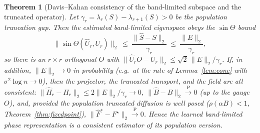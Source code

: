\documentclass[aps,prresearch,reprint,amsmath,amssymb,nofootinbib,superscriptaddress,floatfix]{revtex4-2}
\newtheorem{theorem}{Theorem}
\theoremstyle{definition}
\theoremstyle{remark}
\theoremstyle{plain}
\begin{document}
\begin{theorem}[Davis--Kahan consistency of the band-limited subspace and the truncated operator]
\label{thm:estconsistency}
Let $\gamma_r=\lambda_r(S)-\lambda_{r+1}(S)>0$ be the population truncation gap. Then the estimated
band-limited eigenspace obeys the $\sin\Theta$ bound
\begin{equation}
\|\sin\Theta(\widehat U_r,U_r)\|_2\ \le\ \frac{\|\widehat S-S\|_2}{\gamma_r}
\ \le\ \frac{\|E\|_2}{\gamma_r},
\label{eq:davis-kahan}
\end{equation}
so there is an $r\times r$ orthogonal $O$ with $\|\widehat U_rO-U_r\|_2\le\sqrt2\,\|E\|_2/\gamma_r$. If, in
addition, $\|E\|_2\to0$ in probability (e.g.\ at the rate of Lemma~\ref{lem:conc} with
$\sigma^2\log n\to0$), then the projector, the truncated transport, and the field are all consistent:
$\|\widehat\Pi_r-\Pi_r\|_2\le2\|E\|_2/\gamma_r\to0$,
$\|\widehat B-B\|_2\xrightarrow{\ \mathrm P\ }0$ (up to the gauge $O$), and, provided the population
truncated diffusion is well posed ($\rho(\alpha B)<1$, Theorem~\ref{thm:fixedpoint}),
$\|\widehat F^\star-F^\star\|_2\xrightarrow{\ \mathrm P\ }0$. Hence the learned band-limited phase
representation is a consistent estimator of its population version.
\end{theorem}
\end{document}
